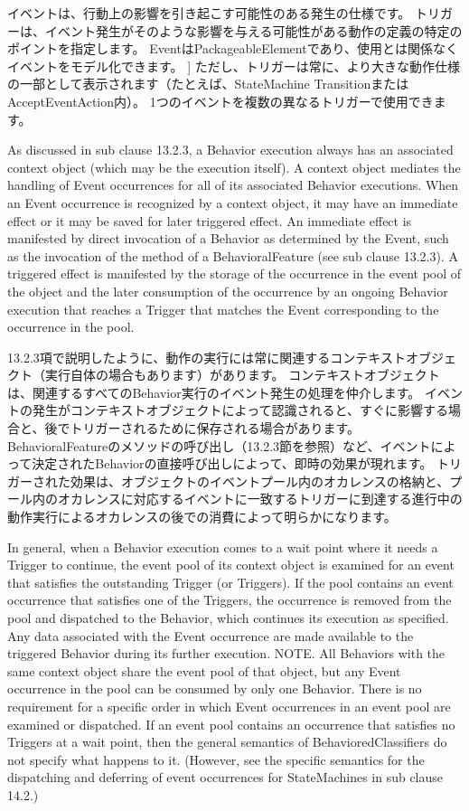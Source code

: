 \documentclass[a4paper,11pt]{ltjsarticle}
\begin{document}
イベントは、行動上の影響を引き起こす可能性のある発生の仕様です。
トリガーは、イベント発生がそのような影響を与える可能性がある動作の定義の特定のポイントを指定します。
EventはPackageableElementであり、使用とは関係なくイベントをモデル化できます。 ]
ただし、トリガーは常に、より大きな動作仕様の一部として表示されます（たとえば、StateMachine TransitionまたはAcceptEventAction内）。
1つのイベントを複数の異なるトリガーで使用できます。

As discussed in sub clause 13.2.3, a Behavior execution always has an associated context object (which may be the execution itself). 
A context object mediates the handling of Event occurrences for all of its associated Behavior executions. 
When an Event occurrence is recognized by a context object, it may have an immediate effect or it may be saved for later triggered effect. 
An immediate effect is manifested by direct invocation of a Behavior as determined by the Event, such as the invocation of the method of a BehavioralFeature (see sub clause 13.2.3). 
A triggered effect is manifested by the storage of the occurrence in the event pool of the object and the later consumption of the occurrence by an ongoing Behavior execution that reaches a Trigger that matches the Event corresponding to the occurrence in the pool.

13.2.3項で説明したように、動作の実行には常に関連するコンテキストオブジェクト（実行自体の場合もあります）があります。
コンテキストオブジェクトは、関連するすべてのBehavior実行のイベント発生の処理を仲介します。
イベントの発生がコンテキストオブジェクトによって認識されると、すぐに影響する場合と、後でトリガーされるために保存される場合があります。
BehavioralFeatureのメソッドの呼び出し（13.2.3節を参照）など、イベントによって決定されたBehaviorの直接呼び出しによって、即時の効果が現れます。
トリガーされた効果は、オブジェクトのイベントプール内のオカレンスの格納と、プール内のオカレンスに対応するイベントに一致するトリガーに到達する進行中の動作実行によるオカレンスの後での消費によって明らかになります。

In general, when a Behavior execution comes to a wait point where it needs a Trigger to continue, the event pool of its context object is examined for an event that satisfies the outstanding Trigger (or Triggers). 
If the pool contains an event occurrence that satisfies one of the Triggers, the occurrence is removed from the pool and dispatched to the Behavior, which continues its execution as specified. 
Any data associated with the Event occurrence are made available to the triggered Behavior during its further execution.
NOTE. All Behaviors with the same context object share the event pool of that object, but any Event occurrence in the pool can be consumed by only one Behavior.
There is no requirement for a specific order in which Event occurrences in an event pool are examined or dispatched. 
If an event pool contains an occurrence that satisfies no Triggers at a wait point, then the general semantics of BehavioredClassifiers do not specify what happens to it. 
(However, see the specific semantics for the dispatching and deferring of event occurrences for StateMachines in sub clause 14.2.)
\end{document}
